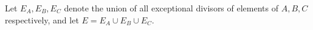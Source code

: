 \documentclass[a4paper,11pt]{article}
\newcommand{\PP}{\mathbb P}
\begin{document}

 

Let $E_A, E_B, E_C$ denote the union of all exceptional divisors of elements of $A, B ,C$ respectively, and let $E=E_A\cup E_B\cup E_C$.
\end{document}
